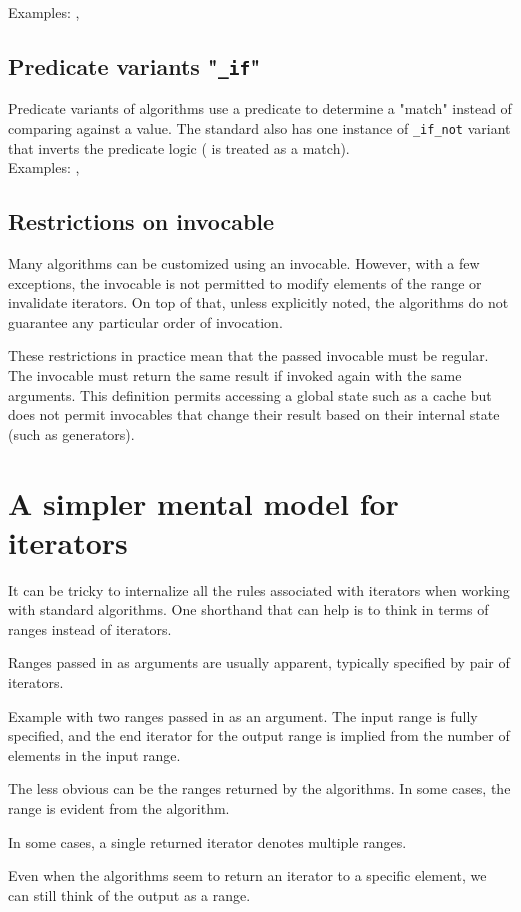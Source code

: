 \noindent Examples: , 

\subsection{Predicate variants "\texttt{\_if}"}

Predicate variants of algorithms use a predicate to determine a "match" instead of comparing against a value. The standard also has one instance of \texttt{\_if\_not} variant that inverts the predicate logic ( is treated as a match).\\

\noindent Examples: , 

\subsection{Restrictions on invocable}

Many algorithms can be customized using an invocable. However, with a few exceptions, the invocable is not permitted to modify elements of the range or invalidate iterators. On top of that, unless explicitly noted, the algorithms do not guarantee any particular order of invocation.

These restrictions in practice mean that the passed invocable must be regular. The invocable must return the same result if invoked again with the same arguments. This definition permits accessing a global state such as a cache but does not permit invocables that change their result based on their internal state (such as generators).

\section{A simpler mental model for iterators}

It can be tricky to internalize all the rules associated with iterators when working with standard algorithms. One shorthand that can help is to think in terms of ranges instead of iterators.

Ranges passed in as arguments are usually apparent, typically specified by pair of iterators.

\begin{box-note}
\footnotesize Example with two ranges passed in as an argument. The input range is fully specified, and the end iterator for the output range is implied from the number of elements in the input range.
\tcblower
{}
\end{box-note}

The less obvious can be the ranges returned by the algorithms. In some cases, the range is evident from the algorithm.



In some cases, a single returned iterator denotes multiple ranges.

Even when the algorithms seem to return an iterator to a specific element, we can still think of the output as a range.